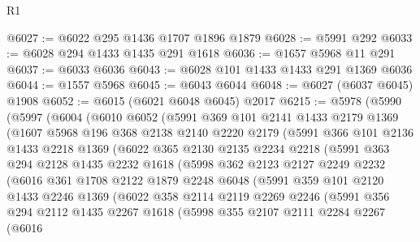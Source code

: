 \begin{lexlean}{R1}
\begin{coremodule}
@6027 := @6022 @295 @1436 @1707 @1896 @1879
@6028 := @5991 @292
@6033 := @6028 @294 @1433 @1435 @291 @1618
@6036 := @1657 @5968 @11 @291
@6037 := @6033 @6036
@6043 := @6028 @101 @1433 @1433 @291 @1369 @6036
@6044 := @1557 @5968
@6045 := @6043 @6044
@6048 := @6027 (@6037 @6045) @1908
@6052 := @6015 (@6021 @6048 @6045) @2017
@6215 := @5978
    (@5990
      (@5997
        (@6004
          (@6010
            @6052
            (@5991
              @369
              @101
              @2141
              @1433
              @2179
              @1369
              (@1607
                @5968
                @196
                @368
                @2138
                @2140
                @2220
                @2179
                (@5991
                  @366
                  @101
                  @2136
                  @1433
                  @2218
                  @1369
                  (@6022
                    @365
                    @2130
                    @2135
                    @2234
                    @2218
                    (@5991
                      @363
                      @294
                      @2128
                      @1435
                      @2232
                      @1618
                      (@5998
                        @362
                        @2123
                        @2127
                        @2249
                        @2232
                        (@6016
                          @361
                          @1708
                          @2122
                          @1879
                          @2248
                          @6048
                          (@5991
                            @359
                            @101
                            @2120
                            @1433
                            @2246
                            @1369
                            (@6022
                              @358
                              @2114
                              @2119
                              @2269
                              @2246
                              (@5991
                                @356
                                @294
                                @2112
                                @1435
                                @2267
                                @1618
                                (@5998
                                  @355
                                  @2107
                                  @2111
                                  @2284
                                  @2267
                                  (@6016

\end{coremodule}
\end{lexlean}
